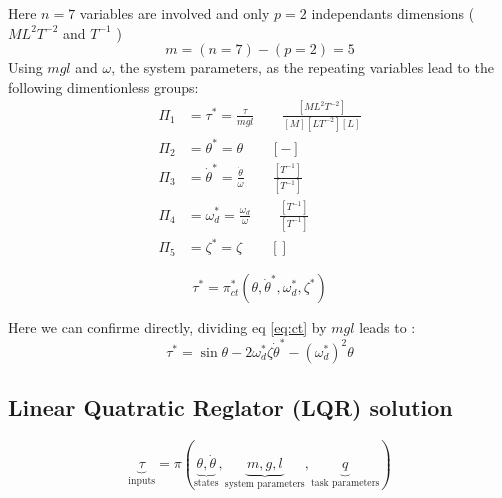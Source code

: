Here $n=7$ variables are involved and only $p=2$ independants dimensions ( $ML^2T^{-2}$ and $T^{-1}$ )
\begin{equation}
m = (n = 7 ) - ( p = 2 ) = 5
\end{equation}
Using $mgl$ and $\omega$, the system parameters, as the repeating variables lead to the following dimentionless groups:
\begin{align}
\Pi_1 &= \tau^* = \frac{\tau}{mgl} \quad \quad \frac{[ML^2T^{-2}]}{[M][LT^{-2}][L]} \\
\Pi_2 &= \theta^* = \theta \quad \quad [-]\\
\Pi_3 &= \dot{\theta}^* = \frac{ \dot{\theta}  }{ \omega } \quad \quad \frac{[T^{-1}]}{[T^{-1}]} \\
\Pi_4 &= \omega_d^* = \frac{\omega_d}{\omega} \quad \quad \frac{[T^{-1}]}{[T^{-1}]} \\
\Pi_5 &= \zeta^* = \zeta \quad \quad []
\end{align}



\begin{equation}
\tau^*
=
\pi^*_{ct} \left(
\theta, \dot{\theta}^*,
\omega_d^* , \zeta^* 
\right)
\end{equation}

Here we can confirme directly, dividing eq \eqref{eq:ct} by $mgl$ leads to :
\begin{equation}
\tau^*
=
\sin \theta
- 2 \omega_d^* \zeta \dot{\theta}^* 
- (\omega_d^*)^2 \theta
\end{equation}





\newpage
\subsection{Linear Quatratic Reglator (LQR) solution}


\begin{equation}
\underbrace{\tau}_{\text{inputs}}
=
\pi \left(
\underbrace{ \theta, \dot{\theta} }_{\text{states}},
\underbrace{ m , g , l }_{\text{system parameters}},
\underbrace{ q }_{\text{task parameters}}
\right)
\end{equation}

